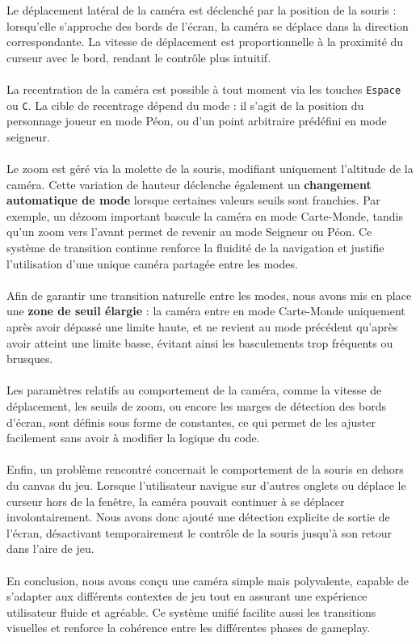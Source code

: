Le déplacement latéral de la caméra est déclenché par la position de la souris : lorsqu’elle s’approche des bords de l’écran, la caméra se déplace dans la direction correspondante. La vitesse de déplacement est proportionnelle à la proximité du curseur avec le bord, rendant le contrôle plus intuitif.
\\ \\
La recentration de la caméra est possible à tout moment via les touches \texttt{Espace} ou \texttt{C}. La cible de recentrage dépend du mode : il s'agit de la position du personnage joueur en mode Péon, ou d’un point arbitraire prédéfini en mode seigneur.
\\ \\
Le zoom est géré via la molette de la souris, modifiant uniquement l'altitude de la caméra. Cette variation de hauteur déclenche également un \textbf{changement automatique de mode} lorsque certaines valeurs seuils sont franchies. Par exemple, un dézoom important bascule la caméra en mode Carte-Monde, tandis qu’un zoom vers l’avant permet de revenir au mode Seigneur ou Péon. Ce système de transition continue renforce la fluidité de la navigation et justifie l'utilisation d’une unique caméra partagée entre les modes.
\\ \\
Afin de garantir une transition naturelle entre les modes, nous avons mis en place une \textbf{zone de seuil élargie} : la caméra entre en mode Carte-Monde uniquement après avoir dépassé une limite haute, et ne revient au mode précédent qu’après avoir atteint une limite basse, évitant ainsi les basculements trop fréquents ou brusques.
\\ \\
Les paramètres relatifs au comportement de la caméra, comme la vitesse de déplacement, les seuils de zoom, ou encore les marges de détection des bords d’écran, sont définis sous forme de constantes, ce qui permet de les ajuster facilement sans avoir à modifier la logique du code.
\\ \\
Enfin, un problème rencontré concernait le comportement de la souris en dehors du canvas du jeu. Lorsque l’utilisateur navigue sur d’autres onglets ou déplace le curseur hors de la fenêtre, la caméra pouvait continuer à se déplacer involontairement. Nous avons donc ajouté une détection explicite de sortie de l’écran, désactivant temporairement le contrôle de la souris jusqu’à son retour dans l’aire de jeu.
\\ \\
En conclusion, nous avons conçu une caméra simple mais polyvalente, capable de s’adapter aux différents contextes de jeu tout en assurant une expérience utilisateur fluide et agréable. Ce système unifié facilite aussi les transitions visuelles et renforce la cohérence entre les différentes phases de gameplay.





